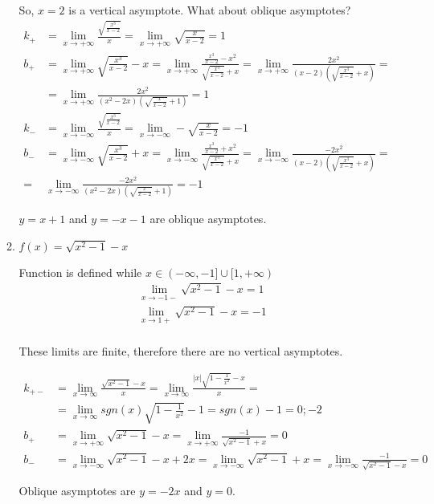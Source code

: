 \documentclass{article}
\begin{document}
\begin{enumerate}
\begin{enumerate}
So, $x=2$ is a vertical asymptote. What about oblique asymptotes?
\begin{align*}
k_{+}&=\lim_{x \to +\infty} \frac{\sqrt{\frac{x^3}{x-2}}}{x}=\lim_{x \to +\infty} \sqrt{\frac{x}{x-2}}=1\\
b_{+}&=\lim_{x \to +\infty} \sqrt{\frac{x^3}{x-2}} - x=\lim_{x \to +\infty} \frac{\frac{x^3}{x-2} - x^2}{\sqrt{\frac{x^3}{x-2}} + x}=\lim_{x \to +\infty} \frac{2x^2}{(x-2)(\sqrt{\frac{x^3}{x-2}} + x)}=\\
&=\lim_{x \to +\infty} \frac{2x^2}{(x^2-2x)(\sqrt{\frac{x}{x-2}} + 1)}=1\\
k_{-}&=\lim_{x \to -\infty} \frac{\sqrt{\frac{x^3}{x-2}}}{x}=\lim_{x \to -\infty} -\sqrt{\frac{x}{x-2}}=-1\\
b_{-}&=\lim_{x \to -\infty} \sqrt{\frac{x^3}{x-2}} + x=\lim_{x \to -\infty} \frac{\frac{x^3}{x-2} + x^2}{\sqrt{\frac{x^3}{x-2}} + x}=\lim_{x \to -\infty} \frac{-2x^2}{(x-2)(\sqrt{\frac{x^3}{x-2}} + x)}=\\
=&\lim_{x \to -\infty} \frac{-2x^2}{(x^2-2x)(\sqrt{\frac{x}{x-2}} + 1)}=-1
\end{align*}

$y=x+1$ and $y=-x-1$ are oblique asymptotes.

\item $f(x)=\sqrt{x^2-1}-x$

Function is defined while $x \in (-\infty, -1] \cup [1, +\infty)$
\begin{align*}
\lim_{x \to -1-} \sqrt{x^2-1}-x=1\\
\lim_{x \to 1+} \sqrt{x^2-1}-x=-1\\
\end{align*}

These limits are finite, therefore there are no vertical asymptotes.

\begin{align*}
k_{+-}&=\lim_{x \to \infty} \frac{\sqrt{x^2-1}-x}{x}=\lim_{x \to \infty} \frac{|x|\sqrt{1-\frac{1}{x^2}}-x}{x}=\\
&=\lim_{x \to \infty} sgn(x)\sqrt{1-\frac{1}{x^2}}-1=sgn(x)-1 = 0; -2\\
b_{+}&=\lim_{x \to +\infty} \sqrt{x^2-1}-x=\lim_{x \to +\infty} \frac{-1}{\sqrt{x^2-1}+x}=0\\
b_{-}&=\lim_{x \to -\infty} \sqrt{x^2-1}-x+2x=\lim_{x \to -\infty} \sqrt{x^2-1}+x=\lim_{x \to -\infty} \frac{-1}{\sqrt{x^2-1}-x}=0
\end{align*}

Oblique asymptotes are $y=-2x$ and $y=0$.


\end{enumerate}
\end{enumerate}
\end{document}
